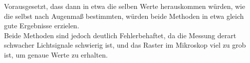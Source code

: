 Vorausgesetzt, dass dann in etwa die selben Werte herauskommen würden, wie die selbst nach Augenmaß bestimmten, würden beide Methoden in etwa gleich gute Ergebnisse erzielen.\\
Beide Methoden sind jedoch deutlich Fehlerbehaftet, da die Messung derart schwacher Lichtsignale schwierig ist, und das Raster im Mikroskop viel zu grob ist, um genaue Werte zu erhalten.





